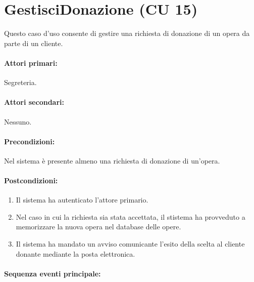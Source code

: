 \documentclass{article}
\begin{document}
\newpage
\section*{GestisciDonazione (CU 15)}
	
	\indent\indent Questo caso d'uso consente di gestire una richiesta di donazione di un opera da parte di un cliente.
	
	\paragraph{Attori primari:}Segreteria.
	
	\paragraph{Attori secondari:}Nessuno.
	
	\paragraph{Precondizioni:}Nel sistema è presente almeno una richiesta di donazione di un'opera.
	
	\paragraph{Postcondizioni:}
	\begin{enumerate}[itemsep=8pt,parsep=0pt]
		\item Il sistema ha autenticato l'attore primario.
		\item Nel caso in cui la richiesta sia stata accettata, il stistema ha provveduto a memorizzare la nuova opera nel database delle opere.
		\item Il sistema ha mandato un avviso comunicante l'esito della scelta al cliente donante mediante la posta elettronica.
	\end{enumerate}
	
	\paragraph{Sequenza eventi principale:}
\end{document}
